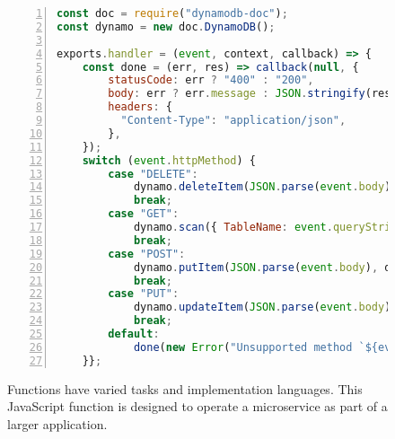 \begin{figure}
  \begin{lstlisting}[language=JavaScript, numbers=left, frame=single, basicstyle=\footnotesize\sffamily, columns=fullflexible]
const doc = require("dynamodb-doc");    
const dynamo = new doc.DynamoDB();

exports.handler = (event, context, callback) => {
    const done = (err, res) => callback(null, {
        statusCode: err ? "400" : "200",
        body: err ? err.message : JSON.stringify(res),
        headers: {
          "Content-Type": "application/json",
        },
    });
    switch (event.httpMethod) {
        case "DELETE":
            dynamo.deleteItem(JSON.parse(event.body), done);
            break;
        case "GET":
            dynamo.scan({ TableName: event.queryStringParameters.TableName }, done);
            break;
        case "POST":
            dynamo.putItem(JSON.parse(event.body), done);
            break;
        case "PUT":
            dynamo.updateItem(JSON.parse(event.body), done);
            break;
        default:
            done(new Error("Unsupported method `${event.httpMethod}'"));
    }};
     \end{lstlisting}
     \caption{Functions have varied tasks and implementation languages.
     This JavaScript function is designed to operate a microservice as part of a larger application.}
     \label{fig:javascript-lambda-example}
\end{figure}

\begin{comment}
  \begin{figure}
  \begin{lstlisting}[frame=single, basicstyle=\footnotesize\sffamily, columns=fullflexible]
GET http://faas.com/img_recogn?input_bucket=9bcc64b9.png
  \end{lstlisting}
  \caption{Invoking a serverless function to perform image recognition. Small inputs may be passed directly, with large ones passed indirectly via storage.}
  \label{fig:lambda-invoke}
\end{figure}
\end{comment}
